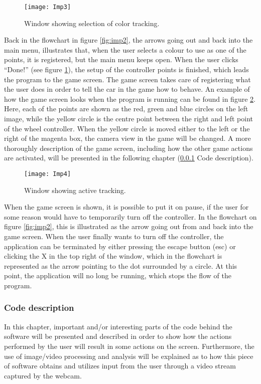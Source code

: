 \begin{figure}[!htbp]
\centering
\texttt{[image: Imp3]}
\caption{Window showing selection of color tracking.} 
\label{fig:imp3}
\end{figure}

Back in the flowchart in figure \ref{fig:imp2}, the arrows going out and back into the main menu, illustrates that, when the user selects a colour to use as one of the points, it is registered, but the main menu keeps open. 
When the user clicks “Done!” (see figure \ref{fig:imp3}), the setup of the controller points is finished, which leads the program to the game screen. 
The game screen takes care of registering what the user does in order to tell the car in the game how to behave. 
An example of how the game screen looks when the program is running can be found in figure \ref{fig:imp4}. 
Here, each of the points are shown as the red, green and blue circles on the left image, while the yellow circle is the centre point between the right and left point of the wheel controller. When the yellow circle is moved either to the left or the right of the magenta box, the camera view in the game will be changed. 
A more thoroughly description of the game screen, including how the other game actions are activated, will be presented in the following chapter (\ref{sec:codedesc} Code description).
\bigskip

\begin{figure}[!htbp]
\centering
\texttt{[image: Imp4]}
\caption{Window showing active tracking.} 
\label{fig:imp4}
\end{figure}

When the game screen is shown, it is possible to put it on pause, if the user for some reason would have to temporarily turn off the controller. 
In the flowchart on figure \ref{fig:imp2}, this is illustrated as the arrow going out from and back into the game screen. 
When the user finally wants to turn off the controller, the application can be terminated by either pressing the escape button (esc) or clicking the X in the top right of the window, which in the flowchart is represented as the arrow pointing to the dot surrounded by a circle. 
At this point, the application will no long be running, which stops the flow of the program.

\subsubsection{Code description} \label{sec:codedesc}
In this chapter, important and/or interesting parts of the code behind the software will be presented and described in order to show how the actions performed by the user will result in some actions on the screen. 
Furthermore, the use of image/video processing and analysis will be explained as to how this piece of software obtains and utilizes input from the user through a video stream captured by the webcam.

